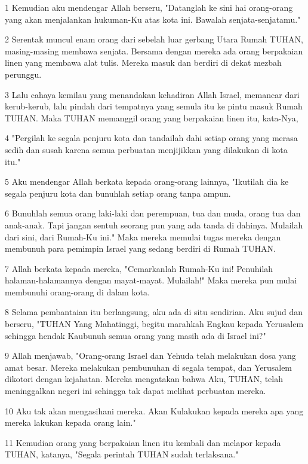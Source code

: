 \par 1 Kemudian aku mendengar Allah berseru, "Datanglah ke sini hai orang-orang yang akan menjalankan hukuman-Ku atas kota ini. Bawalah senjata-senjatamu."
\par 2 Serentak muncul enam orang dari sebelah luar gerbang Utara Rumah TUHAN, masing-masing membawa senjata. Bersama dengan mereka ada orang berpakaian linen yang membawa alat tulis. Mereka masuk dan berdiri di dekat mezbah perunggu.
\par 3 Lalu cahaya kemilau yang menandakan kehadiran Allah Israel, memancar dari kerub-kerub, lalu pindah dari tempatnya yang semula itu ke pintu masuk Rumah TUHAN. Maka TUHAN memanggil orang yang berpakaian linen itu, kata-Nya,
\par 4 "Pergilah ke segala penjuru kota dan tandailah dahi setiap orang yang merasa sedih dan susah karena semua perbuatan menjijikkan yang dilakukan di kota itu."
\par 5 Aku mendengar Allah berkata kepada orang-orang lainnya, "Ikutilah dia ke segala penjuru kota dan bunuhlah setiap orang tanpa ampun.
\par 6 Bunuhlah semua orang laki-laki dan perempuan, tua dan muda, orang tua dan anak-anak. Tapi jangan sentuh seorang pun yang ada tanda di dahinya. Mulailah dari sini, dari Rumah-Ku ini." Maka mereka memulai tugas mereka dengan membunuh para pemimpin Israel yang sedang berdiri di Rumah TUHAN.
\par 7 Allah berkata kepada mereka, "Cemarkanlah Rumah-Ku ini! Penuhilah halaman-halamannya dengan mayat-mayat. Mulailah!" Maka mereka pun mulai membunuhi orang-orang di dalam kota.
\par 8 Selama pembantaian itu berlangsung, aku ada di situ sendirian. Aku sujud dan berseru, "TUHAN Yang Mahatinggi, begitu marahkah Engkau kepada Yerusalem sehingga hendak Kaubunuh semua orang yang masih ada di Israel ini?"
\par 9 Allah menjawab, "Orang-orang Israel dan Yehuda telah melakukan dosa yang amat besar. Mereka melakukan pembunuhan di segala tempat, dan Yerusalem dikotori dengan kejahatan. Mereka mengatakan bahwa Aku, TUHAN, telah meninggalkan negeri ini sehingga tak dapat melihat perbuatan mereka.
\par 10 Aku tak akan mengasihani mereka. Akan Kulakukan kepada mereka apa yang mereka lakukan kepada orang lain."
\par 11 Kemudian orang yang berpakaian linen itu kembali dan melapor kepada TUHAN, katanya, "Segala perintah TUHAN sudah terlaksana."

